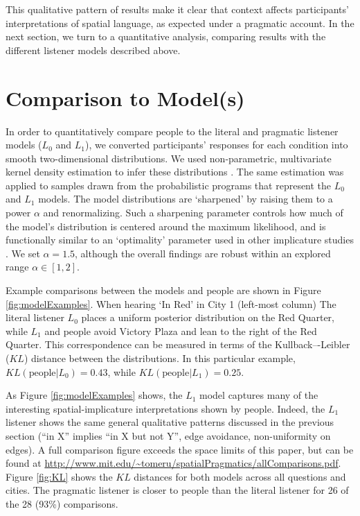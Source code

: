 \documentclass[10pt,letterpaper]{article}
\begin{document}
This qualitative pattern of results make it clear that context affects participants' interpretations of spatial language, as expected under a pragmatic account. In the next section, we turn to a quantitative analysis, comparing results with the different listener models described above. 

\section{Comparison to Model(s)}

In order to quantitatively compare people to the literal and pragmatic listener models ($L_0$ and $L_1$), we converted participants' responses for each condition into smooth two-dimensional distributions. We used non-parametric, multivariate kernel density estimation to infer these distributions \cite{epanechnikov1969non}. The same estimation was applied to samples drawn from the probabilistic programs that represent the $L_0$ and $L_1$ models. The model distributions are `sharpened' by raising them to a power $\alpha$ and renormalizing. Such a sharpening parameter controls how much of the model's distribution is centered around the maximum likelihood, and is functionally similar to an `optimality' parameter used in other implicature studies \cite{ndg+ast:topics2013,kao2014}. We set $\alpha=1.5$, although the overall findings are robust within an explored range $\alpha \in [1,2]$. 

Example comparisons between the models and people are shown in Figure \ref{fig:modelExamples}. When hearing `In Red' in City 1 (left-most column) The literal listener $L_0$ places a uniform posterior distribution on the Red Quarter, while $L_1$ and people avoid Victory Plaza and lean to the right of the Red Quarter. This correspondence can be measured in terms of the Kullback–-Leibler ($KL$) distance between the distributions. In this particular example, $KL(\text{people} | L_0) = 0.43$, while $KL(\text{people} | L_1) = 0.25$. 

As Figure \ref{fig:modelExamples} shows, the $L_1$ model captures many of the interesting spatial-implicature interpretations shown by people.
Indeed, the $L_1$ listener shows the same general qualitative patterns discussed in the previous section (``in X'' implies ``in X but not Y'', edge avoidance, non-uniformity on edges). A full comparison figure exceeds the space limits of this paper, but can be found at \url{http://www.mit.edu/~tomeru/spatialPragmatics/allComparisons.pdf}. Figure \ref{fig:KL} shows the $KL$ distances for both models across all questions and cities. The pragmatic listener is closer to people than the literal listener for 26 of the 28 (93\%) comparisons. 
\end{document}
